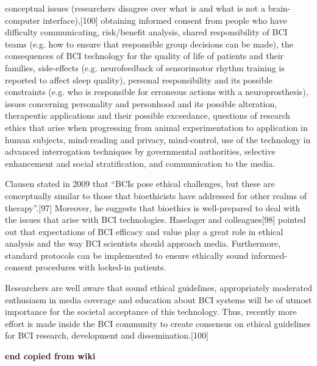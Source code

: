     conceptual issues (researchers disagree over what is and what is not a brain-computer interface),[100]
    obtaining informed consent from people who have difficulty communicating,
    risk/benefit analysis,
    shared responsibility of BCI teams (e.g. how to ensure that responsible group decisions can be made),
    the consequences of BCI technology for the quality of life of patients and their families,
    side-effects (e.g. neurofeedback of sensorimotor rhythm training is reported to affect sleep quality),
    personal responsibility and its possible constraints (e.g. who is responsible for erroneous actions with a neuroprosthesis),
    issues concerning personality and personhood and its possible alteration,
    therapeutic applications and their possible exceedance,
    questions of research ethics that arise when progressing from animal experimentation to application in human subjects,
    mind-reading and privacy,
    mind-control,
    use of the technology in advanced interrogation techniques by governmental authorities,
    selective enhancement and social stratification, and
    communication to the media.

Clausen stated in 2009 that “BCIs pose ethical challenges, but these are conceptually similar to those that bioethicists have addressed for other realms of therapy”.[97] Moreover, he suggests that bioethics is well-prepared to deal with the issues that arise with BCI technologies. Haselager and colleagues[98] pointed out that expectations of BCI efficacy and value play a great role in ethical analysis and the way BCI scientists should approach media. Furthermore, standard protocols can be implemented to ensure ethically sound informed-consent procedures with locked-in patients.

Researchers are well aware that sound ethical guidelines, appropriately moderated enthusiasm in media coverage and education about BCI systems will be of utmost importance for the societal acceptance of this technology. Thus, recently more effort is made inside the BCI community to create consensus on ethical guidelines for BCI research, development and dissemination.[100]


\bf{end copied from wiki} 
